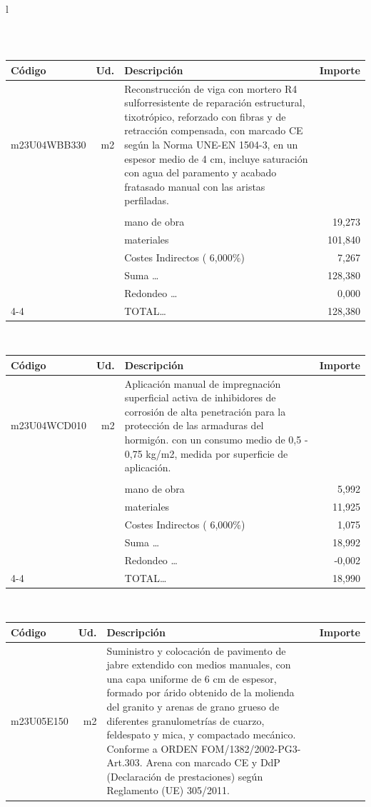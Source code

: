 \documentclass{book}%
\begin{document}
\begin{longtable}{l}
\begin{tabular}{l r p{60mm} r}
\end{tabular}\\%
\begin{tabular}{l r p{60mm} r}%
Código&Ud.&Descripción&Importe\\%
\hline%
m23U04WBB330&m2&Reconstrucción de viga con mortero R4 sulforresistente de reparación estructural, tixotrópico, reforzado con fibras y de retracción compensada, con marcado CE según la Norma UNE{-}EN 1504{-}3, en un espesor medio de 4 cm, incluye saturación con agua del paramento y acabado fratasado manual con las aristas perfiladas.&\\%
&&&\\%
&&mano de obra&    19,273\\%
&&materiales&   101,840\\%
&&Costes Indirectos (     6,000\%)&     7,267\\%
&&Suma \ldots&   128,380\\%
&&Redondeo \ldots&     0,000\\%
\cline{4-4}%
&&TOTAL\ldots&   128,380\\%
\end{tabular}\\%
\begin{tabular}{l r p{60mm} r}%
Código&Ud.&Descripción&Importe\\%
\hline%
m23U04WCD010&m2&Aplicación manual de impregnación superficial activa de inhibidores de corrosión de alta penetración para la protección de las armaduras del hormigón. con un consumo medio de 0,5 {-} 0,75 kg/m2, medida por superficie de aplicación.&\\%
&&&\\%
&&mano de obra&     5,992\\%
&&materiales&    11,925\\%
&&Costes Indirectos (     6,000\%)&     1,075\\%
&&Suma \ldots&    18,992\\%
&&Redondeo \ldots&    {-}0,002\\%
\cline{4-4}%
&&TOTAL\ldots&    18,990\\%
\end{tabular}\\%
\begin{tabular}{l r p{60mm} r}%
Código&Ud.&Descripción&Importe\\%
\hline%
m23U05E150&m2&Suministro y colocación de pavimento de jabre extendido con medios manuales, con una capa uniforme de 6 cm de espesor, formado por árido obtenido de la molienda del granito y arenas de grano grueso de diferentes granulometrías de cuarzo, feldespato y mica, y compactado mecánico. Conforme a ORDEN FOM/1382/2002{-}PG3{-}Art.303. Arena con marcado CE y DdP (Declaración de prestaciones) según Reglamento (UE) 305/2011.&\\%

\end{tabular}
\end{longtable}
\end{document}
